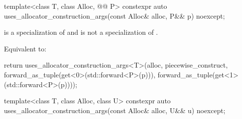 %
\begin{itemdecl}
template<class T, class Alloc, @@ P>
  constexpr auto uses_allocator_construction_args(const Alloc& alloc, P&& p) noexcept;
\end{itemdecl}

\begin{itemdescr}
\pnum
\constraints
{} is a specialization of  and
 is not a specialization of .

\pnum
\effects
Equivalent to:
\begin{codeblock}
return uses_allocator_construction_args<T>(alloc, piecewise_construct,
                                           forward_as_tuple(get<0>(std::forward<P>(p))),
                                           forward_as_tuple(get<1>(std::forward<P>(p))));
\end{codeblock}
\end{itemdescr}

%
\begin{itemdecl}
template<class T, class Alloc, class U>
  constexpr auto uses_allocator_construction_args(const Alloc& alloc, U&& u) noexcept;
\end{itemdecl}

